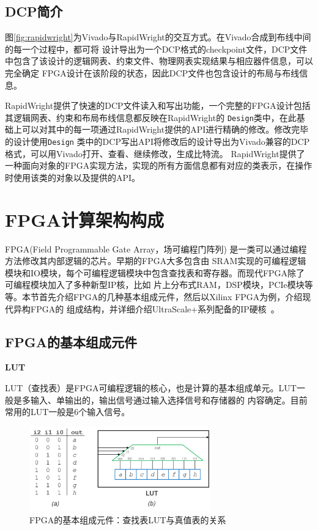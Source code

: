 \subsection{DCP简介}

图\ref{fig:rapidwright}为Vivado与RapidWright的交互方式。在Vivado合成到布线中间的每一个过程中，都可将
设计导出为一个DCP格式的checkpoint文件，DCP文件中包含了该设计的逻辑网表、约束文件、物理网表实现结果与相应器件信息，可以完全确定
FPGA设计在该阶段的状态，因此DCP文件也包含设计的布局与布线信息。

RapidWright提供了快速的DCP文件读入和写出功能，一个完整的FPGA设计包括其逻辑网表、约束和布局布线信息都反映在RapidWright的
\texttt{Design}类中，在此基础上可以对其中的每一项通过RapidWright提供的API进行精确的修改。修改完毕的设计使用\texttt{Design}
类中的DCP写出API将修改后的设计导出为Vivado兼容的DCP格式，可以用Vivado打开、查看、继续修改，生成比特流。
RapidWright提供了一种面向对象的FPGA实现方法，实现的所有方面信息都有对应的类表示，在操作时使用该类的对象以及提供的API。


\section{FPGA计算架构构成}

FPGA(Field Programmable Gate Array，场可编程门阵列) 是一类可以通过编程方法修改其内部逻辑的芯片。早期的FPGA大多包含由
SRAM实现的可编程逻辑模块和IO模块，每个可编程逻辑模块中包含查找表和寄存器。而现代FPGA除了可编程模块加入了多种新型IP核，比如
片上分布式RAM，DSP模块，PCIe模块等等。本节首先介绍FPGA的几种基本组成元件，然后以Xilinx FPGA为例，介绍现代异构FPGA的
组成结构，并详细介绍UltraScale+系列配备的IP硬核~\cite{ug903}。

\subsection{FPGA的基本组成元件}

{\bf LUT}

LUT（查找表）是FPGA可编程逻辑的核心，也是计算的基本组成单元。LUT一般是多输入、单输出的，输出信号通过输入选择信号和存储器的
内容确定。目前常用的LUT一般是6个输入信号。

\begin{figure}[h]
	\centering
	\includegraphics[width=0.7\textwidth]{figure/luts}
	\caption{FPGA的基本组成元件：查找表LUT与真值表的关系~\cite{lavin2018rapidwright}} 
	\label{fig:lut}
\end{figure}

